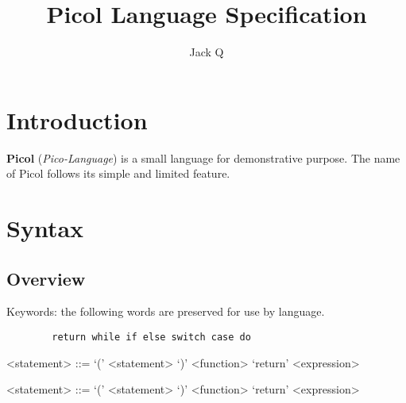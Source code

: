 \documentclass[a4paper, 11.5pt]{article}
\title{Picol Language Specification}
\author{Jack Q}
\begin{document}
\maketitle

  \begin{multicols}{2}

  \section{Introduction}
  {\bfseries Picol} (\emph{Pico-Language}) is a small language for demonstrative purpose. 
  The name of Picol follows its simple and limited feature.

  \section{Syntax}

  \subsection{Overview}

  Keywords: the following words are preserved for use by language.
   
    \begin{center}
      \begin{tcolorbox}[breakable, blanker, width=0.8\linewidth]
        \begin{verbatim}
        return while if else switch case do 
        \end{verbatim}
      \end{tcolorbox}
    \end{center}

\begin{grammar}
  <statement> ::= `(' <statement> `)'
             \alt <function>
             \alt `return' <expression>
\end{grammar}
\begin{grammar}
 <statement> ::= `(' <statement> `)'
             \alt <function>
             \alt `return' <expression>
\end{grammar}

\end{multicols}
\end{document}
